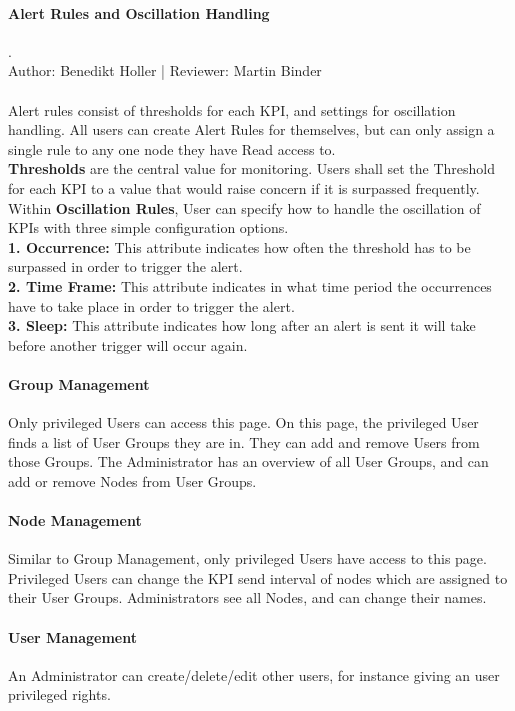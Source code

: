 \documentclass{scrreprt}
\begin{document}
\paragraph{Alert Rules and Oscillation Handling}. \\
Author: Benedikt Holler | Reviewer: Martin Binder \\ \\
Alert rules consist of thresholds for each KPI, and settings for oscillation handling. All users can create Alert Rules for themselves, but can only assign a single rule to any one node they have Read access to. \\
\textbf{Thresholds} are the central value for monitoring. Users shall set the Threshold for each KPI to a value that would raise concern if it is surpassed frequently. Within \textbf{Oscillation Rules}, User can specify how to handle the oscillation of KPIs with three simple configuration options. \\
\textbf{1. Occurrence:} This attribute indicates how often the threshold has to be surpassed in order to trigger the alert. \\
\textbf{2. Time Frame:} This attribute indicates in what time period the occurrences have to take place in order to trigger the alert. \\
\textbf{3. Sleep:} This attribute indicates how long after an alert is sent it will take before another trigger will occur again. \\
\paragraph{Group Management}
Only privileged Users can access this page. On this page, the privileged User finds a list of User Groups they are in. They can add and remove Users from those Groups.
The Administrator has an overview of all User Groups, and can add or remove Nodes from User Groups.
\paragraph{Node Management}
Similar to Group Management, only privileged Users have access to this page. Privileged Users can change the KPI send interval of nodes which are assigned to their User Groups.
Administrators see all Nodes, and can change their names.
\paragraph{User Management}
An Administrator can create/delete/edit other users, for instance giving an user privileged rights.
\end{document}
